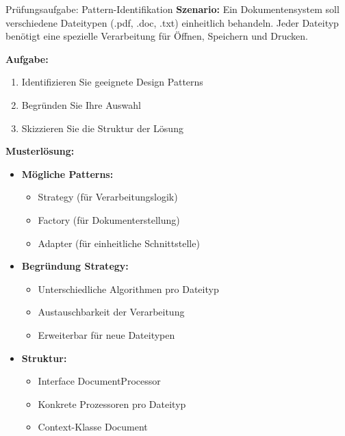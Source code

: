 \begin{example}{Prüfungsaufgabe: Pattern-Identifikation}
\textbf{Szenario:}
Ein Dokumentensystem soll verschiedene Dateitypen (.pdf, .doc, .txt) einheitlich 
behandeln. Jeder Dateityp benötigt eine spezielle Verarbeitung für Öffnen, 
Speichern und Drucken.

\textbf{Aufgabe:}
\begin{enumerate}
    \item Identifizieren Sie geeignete Design Patterns
    \item Begründen Sie Ihre Auswahl
    \item Skizzieren Sie die Struktur der Lösung
\end{enumerate}

\textbf{Musterlösung:}
\begin{itemize}
    \item \textbf{Mögliche Patterns:}
    \begin{itemize}
        \item Strategy (für Verarbeitungslogik)
        \item Factory (für Dokumenterstellung)
        \item Adapter (für einheitliche Schnittstelle)
    \end{itemize}
    
    \item \textbf{Begründung Strategy:}
    \begin{itemize}
        \item Unterschiedliche Algorithmen pro Dateityp
        \item Austauschbarkeit der Verarbeitung
        \item Erweiterbar für neue Dateitypen
    \end{itemize}
    
    \item \textbf{Struktur:}
    \begin{itemize}
        \item Interface DocumentProcessor
        \item Konkrete Prozessoren pro Dateityp
        \item Context-Klasse Document
    \end{itemize}
\end{itemize}
\end{example}

